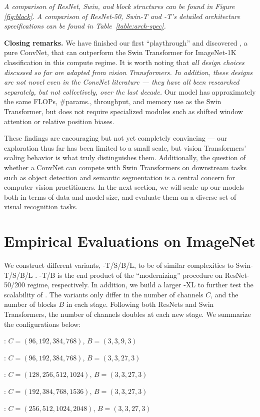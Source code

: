 \documentclass[10pt,twocolumn,letterpaper]{article}
\renewcommand{\paragraph}[1]{\vspace{1.25mm}\noindent\textbf{#1}}
\begin{document}
\textit{A comparison of ResNet, Swin, and \cnn{} block structures can be found in Figure \ref{fig:block}. A comparison of ResNet-50, Swin-T and \cnn{}-T's detailed architecture specifications can be found in Table~\ref{table:arch-spec}.}

\paragraph{Closing remarks.}
We have finished our first ``playthrough'' and discovered \cnn{}, a pure ConvNet, that can outperform the Swin Transformer for ImageNet-1K classification in this compute regime. 
It is worth noting that \emph{all design choices discussed so far are adapted from vision Transformers. \emph{In addition,} these designs are not novel even in the ConvNet literature --- they have all been researched separately, but not collectively, over the last decade.}
Our \cnn{} model has approximately the same FLOPs, \#params., throughput, and memory use as the Swin Transformer, but does not require specialized modules such as shifted window attention or relative position biases. 

These findings are encouraging but not yet completely convincing --- our exploration thus far has been limited to a small scale, but vision Transformers' scaling behavior is what truly distinguishes them. Additionally, the question of whether a ConvNet can compete with Swin Transformers on downstream tasks such as object detection and semantic segmentation is a central concern for computer vision practitioners.
In the next section, we will scale up our \cnn{} models both in terms of data and model size, and evaluate them on a diverse set of visual recognition tasks.


\section{Empirical Evaluations on ImageNet}
\label{sec:convnext_config}
 We construct different \cnn{} variants, \cnn{}-T/S/B/L, to be of similar complexities to Swin-T/S/B/L \cite{Liu2021swin}. \cnn{}-T/B is the end product of the ``modernizing'' procedure on ResNet-50/200 regime, respectively. In addition, we build a larger \cnn{}-XL to further test the scalability of \cnn{}. The variants only differ in the number of channels $C$, and the number of blocks $B$ in each stage. Following both ResNets and Swin Transformers, the number of channels doubles at each new stage. We summarize the configurations below:
\begin{itemize}[leftmargin=-.1ex]
\setlength\itemsep{-.2em}
\small{
\item[]\cb{}: $C=(96,192,384,768)$, $B=(3,3,9,3)$
\item[]\cb{}: $C=(96,192,384,768)$, $B=(3,3,27,3)$
\item[]\cb{}: $C=(128,256,512,1024)$, $B=(3,3,27,3)$
\item[]\cb{}: $C=(192,384,768,1536)$, $B=(3,3,27,3)$
\item[]\cb{}: $C=(256,512,1024,2048)$, $B=(3,3,27,3)$
}
\end{itemize}
\end{document}
